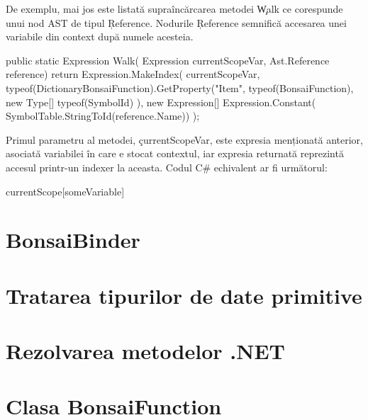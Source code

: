 \documentclass[12pt,a4paper]{memoir}
\begin{document}
De exemplu, mai jos este listată supraîncărcarea metodei \c{Walk} ce corespunde unui nod AST de tipul \c{Reference}. Nodurile \c{Reference} semnifică accesarea unei variabile din context după numele acesteia. 
\begin{code}
public static Expression Walk(
    Expression currentScopeVar,
    Ast.Reference reference)
{
    return Expression.MakeIndex(
        currentScopeVar,
        typeof(DictionaryBonsaiFunction).GetProperty("Item", 
            typeof(BonsaiFunction), new Type[] { typeof(SymbolId) }), 
        new Expression[] { Expression.Constant(
            SymbolTable.StringToId(reference.Name)) });
}
\end{code}
Primul parametru al metodei, \c{currentScopeVar}, este expresia menționată anterior, asociată variabilei în care e stocat contextul, iar expresia returnată reprezintă accesul printr-un indexer la aceasta. Codul C\# echivalent ar fi următorul:
\begin{code}
currentScope[someVariable]
\end{code}

\section{BonsaiBinder}


\section{Tratarea tipurilor de date primitive}


\section{Rezolvarea metodelor .NET}


\section{Clasa BonsaiFunction}


\end{document}
